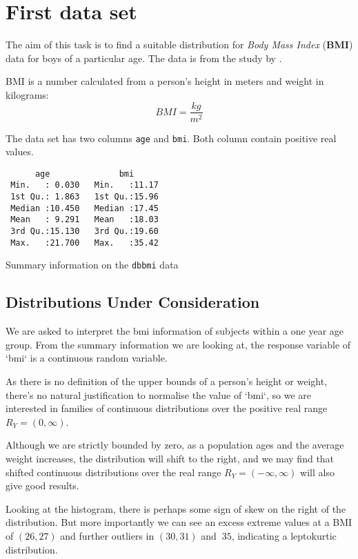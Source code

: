 \section{First data set}

The aim of this task is to find a suitable distribution for \emph{Body Mass Index} (\textbf{BMI}) data for boys of
a particular age.  The data is from the study  by \citeauthor{Fredriks:2000}
\citeyear{Fredriks:2000}.

BMI is a number calculated from a person's height in meters and weight in kilograms:
\begin{equation}
  BMI = \frac{kg}{m^2}
\end{equation}

The data set has two columns \verb|age| and \verb|bmi|.  Both column contain positive real values.

\begin{table}[!ht]
\begin{verbatim}
      age              bmi       
 Min.   : 0.030   Min.   :11.17  
 1st Qu.: 1.863   1st Qu.:15.96  
 Median :10.450   Median :17.45  
 Mean   : 9.291   Mean   :18.03  
 3rd Qu.:15.130   3rd Qu.:19.60  
 Max.   :21.700   Max.   :35.42  
\end{verbatim}
\caption {Summary information on the \texttt{dbbmi} data}
\end{table}


\subsection{Distributions Under Consideration}

We are asked to interpret the bmi information of subjects within a one year
age group.  From the summary information we are looking at, the response
variable of `bmi` is a continuous random variable.

As there is no definition of the upper bounds of a person's height or weight,
there's no natural justification to normalise the value of `bmi`, so we are
interested in families of continuous distributions over the positive real
range $R_Y = (0, \infty)$.

Although we are strictly bounded by zero, as a population ages and the average
weight increases, the distribution will shift to the right, and we may find that
shifted continuous distributions over the real range $R_Y =  (-\infty, \infty)$ will
also give good results.

Looking at the histogram, there is perhaps some sign of skew on the right of the distribution.
But more importantly we can see an excess extreme values at a BMI of $(26, 27)$ and
further outliers in $(30, 31)$ and $~35$, indicating a leptokurtic distribution.

